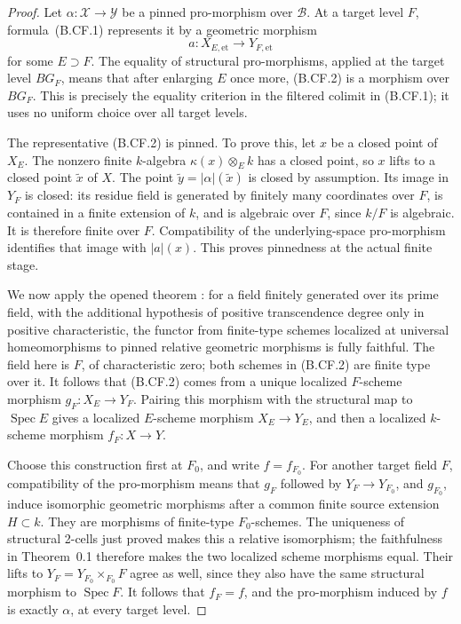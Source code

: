 \documentclass[11pt,a4paper]{article}
\begin{document}
\begin{proof}
Let \(\alpha:\mathcal X\to\mathcal Y\) be a pinned pro-morphism over
\(\mathcal B\). At a target level \(F\), formula~(B.CF.1) represents
it by a geometric morphism
\[
             a:X_{E,\mathrm{et}}\longrightarrow Y_{F,\mathrm{et}}
                                                        \tag{B.CF.2}
\]
for some \(E\supset F\). The equality of structural pro-morphisms,
applied at the target level \(BG_F\), means that after enlarging \(E\)
once more, (B.CF.2) is a morphism over \(BG_F\). This is precisely the
equality criterion in the filtered colimit in (B.CF.1); it uses no
uniform choice over all target levels.

The representative (B.CF.2) is pinned. To prove this, let \(x\) be a
closed point of \(X_E\). The nonzero finite \(k\)-algebra
\(\kappa(x)\otimes_E k\) has a closed point, so \(x\) lifts to a
closed point \(\widetilde x\) of \(X\). The point
\(\widetilde y=|\alpha|(\widetilde x)\) is closed by assumption.
Its image in \(Y_F\) is closed: its residue field is generated by
finitely many coordinates over \(F\), is contained in a finite
extension of \(k\), and is algebraic over \(F\), since \(k/F\) is
algebraic. It is therefore finite over \(F\). Compatibility of the
underlying-space pro-morphism identifies that image with \(|a|(x)\).
This proves pinnedness at the actual finite stage.

We now apply the opened theorem
\citep[Theorem~0.1 and the equivalent formulation~(0.2)]{CarlsonHaineWolf2024}:
for a field finitely generated over its prime field, with the additional
hypothesis of positive transcendence degree only in positive
characteristic, the functor from finite-type schemes localized at
universal homeomorphisms to pinned relative geometric morphisms is
fully faithful. The field here is \(F\), of characteristic zero;
both schemes in (B.CF.2) are finite type over it. It follows that
(B.CF.2) comes from a unique localized \(F\)-scheme morphism
\(g_F:X_E\to Y_F\). Pairing this morphism with the structural map
to \(\operatorname{Spec}E\) gives a localized \(E\)-scheme morphism
\(X_E\to Y_E\), and then a localized \(k\)-scheme morphism
\(f_F:X\to Y\).

Choose this construction first at \(F_0\), and write \(f=f_{F_0}\).
For another target field \(F\), compatibility of the pro-morphism
means that \(g_F\) followed by \(Y_F\to Y_{F_0}\), and \(g_{F_0}\),
induce isomorphic geometric morphisms after a common finite source
extension \(H\subset k\). They are morphisms of finite-type
\(F_0\)-schemes. The uniqueness of structural 2-cells just proved
makes this a relative isomorphism; the faithfulness in Theorem~0.1
therefore makes the two localized scheme morphisms equal.
Their lifts to \(Y_F=Y_{F_0}\times_{F_0}F\) agree as well, since they
also have the same structural morphism to \(\operatorname{Spec}F\).
It follows that \(f_F=f\), and the pro-morphism induced by \(f\)
is exactly \(\alpha\), at every target level.


\end{proof}
\end{document}

